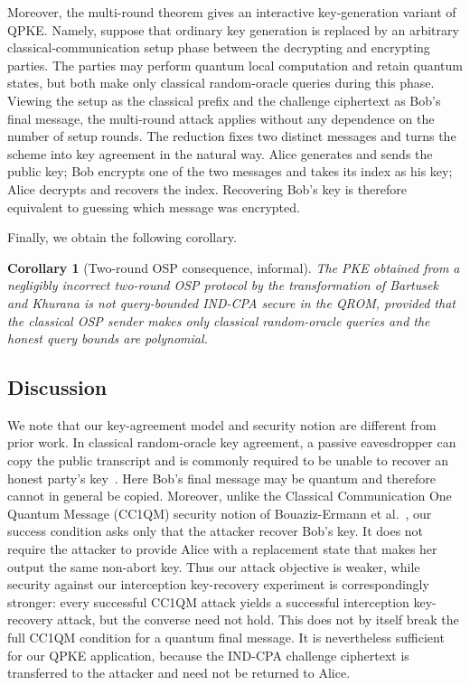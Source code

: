 \documentclass[11pt]{article}
\newtheorem{corollary}[corollary]{Corollary}
\begin{document}
Moreover, the multi-round theorem gives an interactive key-generation variant of QPKE.  Namely, suppose that ordinary key generation is
replaced by an arbitrary classical-communication setup phase between the
decrypting and encrypting parties.  The parties may perform quantum local
computation and retain quantum states, but both make only classical
random-oracle queries during this phase.  Viewing the setup as the classical
prefix and the challenge ciphertext as Bob's final message, the multi-round
attack applies without any dependence on the number of setup rounds. The reduction fixes two distinct messages and turns the scheme into key
agreement in the natural way. Alice generates and sends the public key; Bob
encrypts one of the two messages and takes its index as his key; Alice
decrypts and recovers the index. Recovering Bob's key is therefore equivalent
to guessing which message was encrypted.

Finally, we obtain the following corollary.

\begin{corollary}[Two-round OSP consequence, informal]
The PKE obtained from a negligibly incorrect two-round OSP protocol by the
transformation of Bartusek and Khurana is not query-bounded IND-CPA secure in
the QROM, provided that the classical OSP sender makes only classical
random-oracle queries and the honest query bounds are polynomial.
\end{corollary}

\subsection{Discussion}

We note that our key-agreement model and security notion are different from prior work.
In classical random-oracle key agreement, a passive eavesdropper can copy the
public transcript and is commonly required to be unable to recover an honest
party's key~\cite{BarakMahmoodyFull}. Here Bob's final message may be quantum
and therefore cannot in general be copied. Moreover, unlike the Classical
Communication One Quantum Message (CC1QM) security notion of Bouaziz-Ermann
et al.~\cite[Definition~3.1]{BouazizEtAl24}, our success condition asks only
that the attacker recover Bob's key. It does not require the attacker to
provide Alice with a replacement state that makes her output the same
non-abort key. Thus our attack objective is weaker, while security against
our interception key-recovery experiment is correspondingly stronger: every
successful CC1QM attack yields a successful interception key-recovery attack,
but the converse need not hold. This does not by itself break the full CC1QM
condition for a quantum final message. It is nevertheless sufficient for our
QPKE application, because the IND-CPA challenge ciphertext is transferred to
the attacker and need not be returned to Alice.
\end{document}
